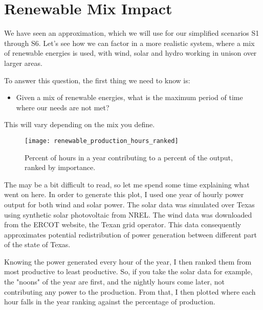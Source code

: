 \section{Renewable Mix Impact}

We have seen an approximation, which we will use for our simplified scenarios S1 through S6. Let's see how we can factor in a more realistic system, where a mix of renewable energies is used, with wind, solar and hydro working in unison over larger areas.

To answer this question, the first thing we need to know is:

\begin{itemize}
\item Given a mix of renewable energies, what is the maximum period of time where our needs are not met?
\end{itemize}

This will vary depending on the mix you define.


\begin{figure}[ht]
	\texttt{[image: renewable\_production\_hours\_ranked]}
	\caption[Percent of hours in a year contributing to a percent of the output, ranked by importance]{Percent of hours in a year contributing to a percent of the output, ranked by importance.}
\end{figure}

The  may be a bit difficult to read, so let me spend some time explaining what went on here. In order to generate this plot, I used one year of hourly power output for both wind and solar power. The solar data was simulated over Texas using synthetic solar photovoltaic from NREL. The wind data was downloaded from the ERCOT website, the Texan grid operator. This data consequently approximates potential redistribution of power generation between different part of the state of Texas.

Knowing the power generated every hour of the year, I then ranked them from most productive to least productive. So, if you take the solar data for example, the "noons" of the year are first, and the nightly hours come later, not contributing any power to the production. From that, I then plotted where each hour falls in the year ranking against the percentage of production.

